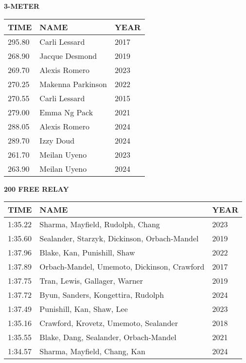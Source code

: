 \vspace{0.4cm}

\begin{center}
\begin{minipage}[t]{0.7\textwidth}
\centering
\textbf{3-METER}\\[0.05cm]
\begin{tabular}{@{}p{1.8cm}p{2.8cm}p{1.2cm}@{}}
\hline
\textbf{TIME} & \textbf{NAME} & \textbf{YEAR} \\
\hline
295.80 & Carli Lessard & 2017 \\
268.90 & Jacque Desmond & 2019 \\
269.70 & Alexis Romero & 2023 \\
270.25 & Makenna Parkinson & 2022 \\
270.55 & Carli Lessard & 2015 \\
279.00 & Emma Ng Pack & 2021 \\
288.05 & Alexis Romero & 2024 \\
289.70 & Izzy Doud & 2024 \\
261.70 & Meilan Uyeno & 2023 \\
263.90 & Meilan Uyeno & 2024 \\
\hline
\end{tabular}
\end{minipage}
\end{center}

\vspace{0.4cm}

\begin{center}
\begin{minipage}[t]{0.7\textwidth}
\centering
\textbf{200 FREE RELAY}\\[0.05cm]
\begin{tabular}{@{}p{1.8cm}p{2.8cm}p{1.2cm}@{}}
\hline
\textbf{TIME} & \textbf{NAME} & \textbf{YEAR} \\
\hline
1:35.22 & Sharma, Mayfield, Rudolph, Chang & 2023 \\
1:35.60 & Sealander, Starzyk, Dickinson, Orbach-Mandel & 2019 \\
1:37.96 & Blake, Kan, Punishill, Shaw & 2022 \\
1:37.89 & Orbach-Mandel, Umemoto, Dickinson, Crawford & 2017 \\
1:37.75 & Tran, Lewis, Gallager, Warner & 2019 \\
1:37.72 & Byun, Sanders, Kongettira, Rudolph & 2024 \\
1:37.49 & Punishill, Kan, Shaw, Lee & 2023 \\
1:35.16 & Crawford, Krovetz, Umemoto, Sealander & 2018 \\
1:35.55 & Blake, Dang, Sealander, Orbach-Mandel & 2021 \\
1:34.57 & Sharma, Mayfield, Chang, Kan & 2024 \\
\hline
\end{tabular}
\end{minipage}
\end{center}

